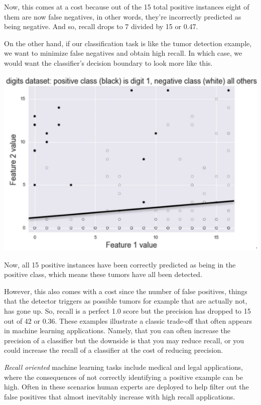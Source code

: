 \begin{multicols}{2}
Now, this comes at a cost because out of the 15 total positive instances eight of them are now false negatives, in other words, they're incorrectly predicted as being negative. And so, recall drops to 7 divided by 15 or 0.47. 

On the other hand, if our classification task is like the tumor detection example, we want to minimize false negatives and obtain high recall. In which case, we would want the classifier's decision boundary to look more like this.

\begin{center}
\includegraphics[width=\linewidth]{img/Low-Precision-High-Recall.png} 
\end{center}

 Now, all 15 positive instances have been correctly predicted as being in the positive class, which means these tumors have all been detected. 

However, this also comes with a cost since the number of false positives, things that the detector triggers as possible tumors for example that are actually not, has gone up. So, recall is a perfect 1.0 score but the precision has dropped to 15 out of 42 or 0.36. These examples illustrate a classic trade-off that often appears in machine learning applications. Namely, that you can often increase the precision of a classifier but the downside is that you may reduce recall, or you could increase the recall of a classifier at the cost of reducing precision. 

\emph{Recall oriented} machine learning tasks include medical and legal applications, where the consequences of not correctly identifying a positive example can be high. Often in these scenarios human experts are deployed to help filter out the false positives that almost inevitably increase with high recall applications. 


\end{multicols}
